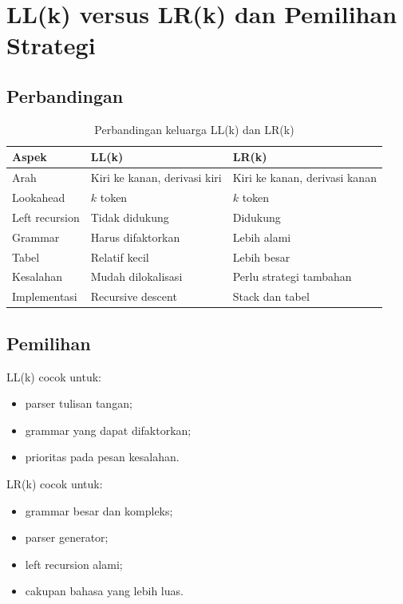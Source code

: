 \section{LL(k) versus LR(k) dan Pemilihan Strategi}
\label{sec:ch12-ll-lr}

\subsection{Perbandingan}

\begin{table}[H]
\centering
\caption{Perbandingan keluarga LL(k) dan LR(k)}
\label{tab:ch12-ll-lr}
\begin{tabularx}{\textwidth}{@{}lXX@{}}
\toprule
\textbf{Aspek} & \textbf{LL(k)} & \textbf{LR(k)} \\
\midrule
Arah & Kiri ke kanan, derivasi kiri & Kiri ke kanan, derivasi kanan \\
Lookahead & \(k\) token & \(k\) token \\
Left recursion & Tidak didukung & Didukung \\
Grammar & Harus difaktorkan & Lebih alami \\
Tabel & Relatif kecil & Lebih besar \\
Kesalahan & Mudah dilokalisasi & Perlu strategi tambahan \\
Implementasi & Recursive descent & Stack dan tabel \\
\bottomrule
\end{tabularx}
\end{table}

\subsection{Pemilihan}

LL(k) cocok untuk:
\begin{itemize}[leftmargin=*]
  \item parser tulisan tangan;
  \item grammar yang dapat difaktorkan;
  \item prioritas pada pesan kesalahan.
\end{itemize}

LR(k) cocok untuk:
\begin{itemize}[leftmargin=*]
  \item grammar besar dan kompleks;
  \item parser generator;
  \item left recursion alami;
  \item cakupan bahasa yang lebih luas.
\end{itemize}

